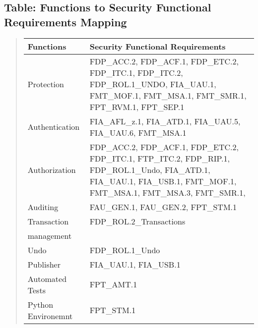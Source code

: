\documentclass[10pt,a4paper,english]{article}
\newlength{\locallinewidth}
\begin{document}

\hypertarget{table-functions-to-security-functional-requirements-mapping}{}
\subsection*{Table: Functions to Security Functional Requirements Mapping}
\begin{quote}

\begin{longtable}[c]{|p{0.23\locallinewidth}|p{0.59\locallinewidth}|}
\hline
\textbf{
Functions
} & \textbf{
Security Functional Requirements
} \\
\hline
\endhead

Protection
 & 
FDP{\_}ACC.2, FDP{\_}ACF.1, FDP{\_}ETC.2, FDP{\_}ITC.1,
FDP{\_}ITC.2, FDP{\_}ROL.1{\_}UNDO, FIA{\_}UAU.1, FMT{\_}MOF.1,
FMT{\_}MSA.1, FMT{\_}SMR.1, FPT{\_}RVM.1, FPT{\_}SEP.1
 \\
\hline

Authentication
 & 
FIA{\_}AFL{\_}z.1, FIA{\_}ATD.1, FIA{\_}UAU.5, FIA{\_}UAU.6,
FMT{\_}MSA.1
 \\
\hline

Authorization
 & 
FDP{\_}ACC.2, FDP{\_}ACF.1, FDP{\_}ETC.2, FDP{\_}ITC.1,
FTP{\_}ITC.2, FDP{\_}RIP.1, FDP{\_}ROL.1{\_}Undo, FIA{\_}ATD.1,
FIA{\_}UAU.1, FIA{\_}USB.1, FMT{\_}MOF.1, FMT{\_}MSA.1,
FMT{\_}MSA.3, FMT{\_}SMR.1,
 \\
\hline

Auditing
 & 
FAU{\_}GEN.1, FAU{\_}GEN.2, FPT{\_}STM.1
 \\
\hline

Transaction
 & 
FDP{\_}ROL.2{\_}Transactions
 \\
\hline

management
 &  \\
\hline

Undo
 & 
FDP{\_}ROL.1{\_}Undo
 \\
\hline

Publisher
 & 
FIA{\_}UAU.1, FIA{\_}USB.1
 \\
\hline

Automated Tests
 & 
FPT{\_}AMT.1
 \\
\hline

Python Environemnt
 & 
FPT{\_}STM.1
 \\
\hline
\end{longtable}
\end{quote}
\end{document}
